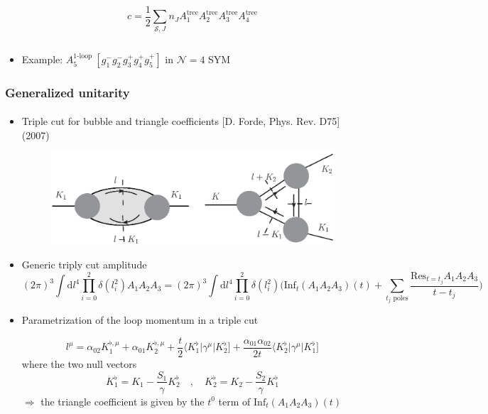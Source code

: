 \documentclass[english]{beamer}
\newcommand{\dd}{\textrm{d}}
\newcommand{\res}{\mathrm{Res}}
\begin{document}
\begin{frame}[shrink=20]
\begin{itemize}
\begin{columns}
\begin{column}{0.5\textwidth}
\begin{equation*}
c = \frac{1}{2}\sum_{\mathcal{S}, J}n_J A_1^{\mathrm{tree}}A_2^{\mathrm{tree}}A_3^{\mathrm{tree}}A_4^{\mathrm{tree}}
\end{equation*}

\end{column}
\end{columns}
\item<5-> Example:  $A_5^{\textrm{1-loop }}[g_1^-g_2^-g_3^+g_4^+g_5^+]$ in  $\mathcal{N}=4$ SYM

\end{itemize}

\end{frame}
\begin{frame}[shrink=10]
\frametitle{Generalized unitarity}
\framesubtitle{}
\begin{itemize}
\item<1-> Triple cut for bubble and triangle coefficients
\tiny\color{blue}
[D. Forde, Phys. Rev. D75]
(2007)
\color{black}\normalsize
\begin{figure}[h]
  \centering
  \includegraphics[width=0.5\linewidth]{triple_cut.eps}
\end{figure}

\item<2-> Generic triply cut amplitude
\small
\begin{equation*}
(2\pi)^3\int\dd l^4 \prod_{i=0}^2 \delta(l_i^2) A_1A_2A_3 = 
(2\pi)^3\int\dd l^4 \prod_{i=0}^2 \delta(l_i^2)\Big(\mathrm{Inf}_t(A_1A_2A_3)(t) + \sum_{\textrm{$t_j$ poles}}\frac{\res_{t = t_j}A_1 A_2 A_3}{t-t_j}\Big)
\end{equation*}
\normalsize
\item<3-> Parametrization of the loop momentum in a triple cut

\small
\begin{equation*}
l^\mu = \alpha_{02} K_1^{\flat,\mu} + \alpha_{01}K_2^{\flat,\mu} + \frac{t}{2}\langle K_1^\flat | \gamma^\mu |K_2^\flat] + \frac{\alpha_{01}\alpha_{02}}{2t}\langle K_2^\flat|\gamma^\mu |K_1^\flat]
\end{equation*}
\normalsize
where the two null vectors
\small
\begin{equation*}
K_1^\flat = K_1 - \frac{S_1}{\gamma}K_2^\flat \quad,\quad
K_2^\flat = K_2 - \frac{S_2}{\gamma}K_1^\flat
\end{equation*}
\normalsize
$\Rightarrow$ the triangle coefficient is given by the $t^0$ term of $\mathrm{Inf}_t(A_1A_2A_3)(t)$


\end{itemize}
\end{frame}
\end{document}
